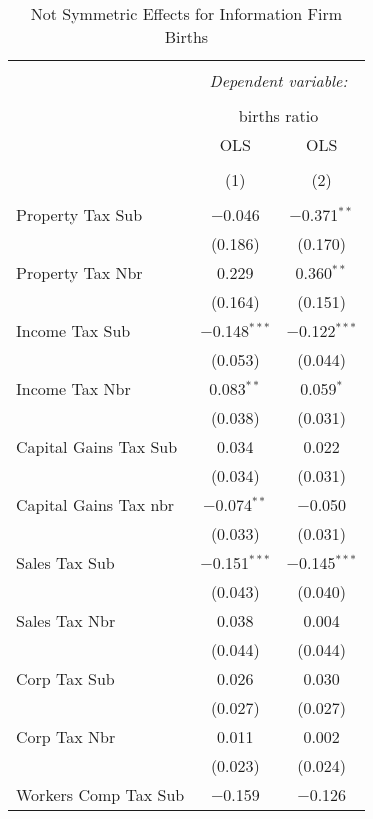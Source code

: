 
\begin{table}[!htbp] \centering 
  \caption{Not Symmetric Effects for  Information Firm Births} 
  \label{51noequality} 
\footnotesize 
\begin{tabular}{@{\extracolsep{5pt}}lcc} 
\\[-1.8ex]\hline 
\hline \\[-1.8ex] 
 & \multicolumn{2}{c}{\textit{Dependent variable:}} \\ 
\cline{2-3} 
\\[-1.8ex] & \multicolumn{2}{c}{births ratio} \\ 
 & OLS & OLS \\ 
\\[-1.8ex] & (1) & (2)\\ 
\hline \\[-1.8ex] 
 Property Tax Sub & $-$0.046 & $-$0.371$^{**}$ \\ 
  & (0.186) & (0.170) \\ 
  Property Tax Nbr & 0.229 & 0.360$^{**}$ \\ 
  & (0.164) & (0.151) \\ 
  Income Tax Sub & $-$0.148$^{***}$ & $-$0.122$^{***}$ \\ 
  & (0.053) & (0.044) \\ 
  Income Tax Nbr & 0.083$^{**}$ & 0.059$^{*}$ \\ 
  & (0.038) & (0.031) \\ 
  Capital Gains Tax Sub & 0.034 & 0.022 \\ 
  & (0.034) & (0.031) \\ 
  Capital Gains Tax nbr & $-$0.074$^{**}$ & $-$0.050 \\ 
  & (0.033) & (0.031) \\ 
  Sales Tax Sub & $-$0.151$^{***}$ & $-$0.145$^{***}$ \\ 
  & (0.043) & (0.040) \\ 
  Sales Tax Nbr & 0.038 & 0.004 \\ 
  & (0.044) & (0.044) \\ 
  Corp Tax Sub & 0.026 & 0.030 \\ 
  & (0.027) & (0.027) \\ 
  Corp Tax Nbr & 0.011 & 0.002 \\ 
  & (0.023) & (0.024) \\ 
  Workers Comp Tax Sub & $-$0.159 & $-$0.126 \\ 

\end{tabular}
\end{table}

